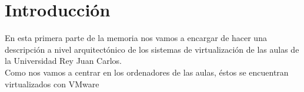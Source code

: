 \chapter{Introducción}
\lettrine[lines=1,slope=4pt,findent=0pt]{E}{}n esta primera parte de la memoria nos vamos a encargar de hacer una descripción a nivel arquitectónico de los sistemas de virtualización de las aulas de la Universidad Rey Juan Carlos.\\

\noindent Como nos vamos a centrar en los ordenadores de las aulas, éstos se encuentran virtualizados con VMware~\cite{vmware}

